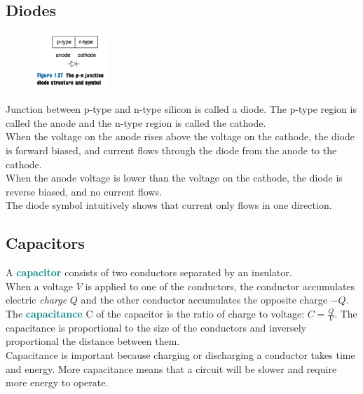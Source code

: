 \documentclass[12pt]{article}
\theoremstyle{definition}
\newcommand{\defnterm}[1]{\textbf{\textcolor{teal}{#1}}\index{#1}}
\begin{document}
  \subsection{Diodes}
  \begin{figure}
    \centering
    \includegraphics[width=0.25\textwidth]{pictures/diode.png}
  \end{figure}
  Junction between p-type and n-type silicon is called a diode.
  The p-type region is called the anode and the n-type region is called the cathode. \\
  When the voltage on the anode rises above the voltage on the cathode, the diode is forward biased, and current flows through the diode from the anode to the cathode. \\
  When the anode voltage is lower than the voltage on the cathode, the diode is reverse biased, and no current flows. \\
  The diode symbol intuitively shows that current only flows in one direction.

  \subsection{Capacitors}
  A \defnterm{capacitor} consists of two conductors separated by an insulator. \\
  When a voltage $V$ is applied to one of the conductors, the conductor accumulates electric \emph{charge} $Q$ and the other conductor accumulates the opposite charge $-Q$. \\
  The \defnterm{capacitance} C of the capacitor is the ratio of charge to voltage: $C = \frac{Q}{V}$.
  The capacitance is proportional to the size of the conductors and inversely proportional the distance between them. \\
  Capacitance is important because charging or discharging a conductor takes time and energy. More capacitance means that a circuit will be slower and require more energy to operate.
\end{document}
